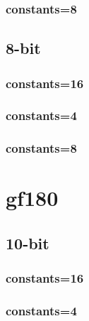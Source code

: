 \documentclass{article}
\begin{document}
\subsubsection*{constants=8}
\begin{figure}[H]
\centering
\resizebox{0.95\linewidth}{!}{}
\end{figure}
\subsection*{8-bit}
\subsubsection*{constants=16}
\begin{figure}[H]
\centering
\resizebox{0.95\linewidth}{!}{}
\end{figure}
\subsubsection*{constants=4}
\begin{figure}[H]
\centering
\resizebox{0.95\linewidth}{!}{}
\end{figure}
\subsubsection*{constants=8}
\begin{figure}[H]
\centering
\resizebox{0.95\linewidth}{!}{}
\end{figure}
\section*{gf180}
\subsection*{10-bit}
\subsubsection*{constants=16}
\begin{figure}[H]
\centering
\resizebox{0.95\linewidth}{!}{}
\end{figure}
\subsubsection*{constants=4}
\begin{figure}[H]
\centering
\resizebox{0.95\linewidth}{!}{}
\end{figure}
\end{document}
